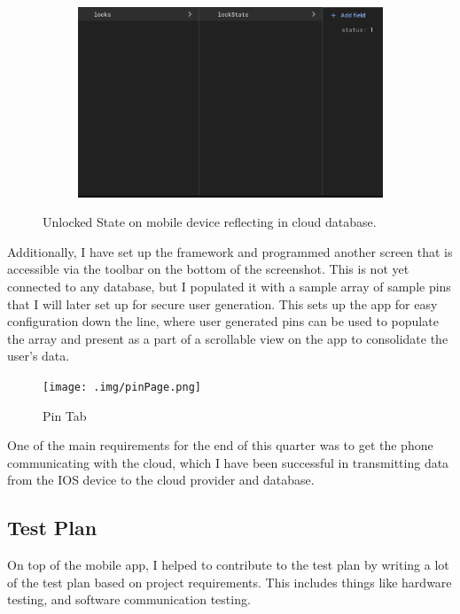 \begin{figure}[h]
\begin{subfigure}{0.3\textwidth}
         \caption{}
         \label{fig:1a}
     \end{subfigure}
     \begin{subfigure}{0.6\textwidth}
         \centering
         \includegraphics[width=\linewidth]{./img/lockState.png}
         \caption{}
         \label{fig:1b}
     \end{subfigure}
     \caption{Unlocked State on mobile device reflecting in cloud database.}
     \label{fig:1}
\end{figure}
\newpage
Additionally, I have set up the framework and programmed another screen that is accessible via the toolbar on the bottom of the screenshot. This is not yet connected to any database, but I populated it with a sample array of sample pins that I will later set up for secure user generation. This sets up the app for easy configuration down the line, where user generated pins can be used to populate the array and present as a part of a scrollable view on the app to consolidate the user's data.

\begin{figure}[htbp]
    \centering
    \texttt{[image: .img/pinPage.png]}
    \caption{Pin Tab}
    \label{fig:pin}
\end{figure}
One of the main requirements for the end of this quarter was to get the phone communicating with the cloud, which I have been successful in transmitting data from the IOS device to the cloud provider and database.

\subsection{Test Plan}

On top of the mobile app, I helped to contribute to the test plan by writing a lot of the test plan based on project requirements. This includes things like hardware testing, and software communication testing.


